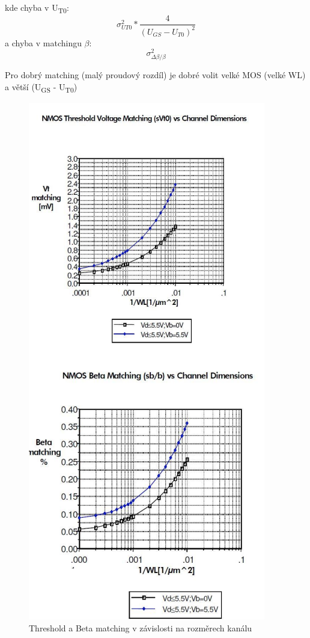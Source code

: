 kde chyba v U\textsubscript{T0}:
\begin{equation}
\sigma_{UT0}^2*\frac{4}{(U_{GS}-U_{T0})^2}
\end{equation}
a chyba v matchingu $\beta$:
\begin{equation}
\sigma_{\Delta \beta / \beta}^2
\end{equation}

Pro dobrý matching (malý proudový rozdíl) je dobré volit velké MOS (velké WL) a větší (U\textsubscript{GS} - U\textsubscript{T0})

\begin{figure}[h]
   \begin{center}
     \includegraphics[scale=0.8]{images/grafy.png}
   \end{center}
   \caption{Threshold a Beta matching v závislosti na rozměrech kanálu}
\end{figure}

















